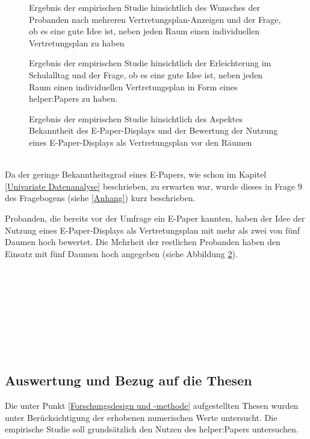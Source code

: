 \documentclass[10pt]{article}
\begin{document}
\begin{figure}[H]
  \centering
  \begin{minipage}[b]{0.49\textwidth}
    
  \caption{Ergebnis der empirischen Studie hinsichtlich des Wunsches der Probanden nach mehreren Vertretungsplan-Anzeigen und der Frage, ob es eine gute Idee ist, neben jeden Raum einen individuellen Vertretungsplan zu haben}
  \label{wunsch mehrere individuelle Anzeigen des vertretungsplans }
  \end{minipage}
  \hfill
  \begin{minipage}[b]{0.49\textwidth}
    
  \caption{Ergebnis der empirischen Studie hinsichtlich der Erleichterung im Schulalltag und der Frage, ob es eine gute Idee ist, neben jeden Raum einen individuellen Vertretungsplan in Form eines helper:Papers zu haben.}
  \label{Erleichterung durch helper:Paper}
  \end{minipage}
\end{figure}
\clearpage
\begin{figure}
  \centering 
  
  \caption{Ergebnis der empirischen Studie hinsichtlich des Aspektes Bekanntheit des E-Paper-Displays und der Bewertung der Nutzung eines E-Paper-Displays als Vertretungsplan vor den Räumen}
  \label{Sinnvoller Einsatz des helper:Papers}
\end{figure}
\mbox{}\\Da der geringe Bekanntheitsgrad eines E-Papers, wie schon im Kapitel \ref{Univariate Datenanalyse} beschrieben, zu erwarten war, wurde dieses in Frage 9 des Fragebogens (siehe \ref{Anhang}) kurz beschrieben. 

Probanden, die bereits vor der Umfrage ein E-Paper kannten, haben der Idee der Nutzung eines E-Paper-Displays als Vertretungsplan mit mehr als zwei von fünf Daumen hoch bewertet.
Die Mehrheit der restlichen Probanden haben den Einsatz mit fünf Daumen hoch angegeben (siehe Abbildung \ref{Sinnvoller Einsatz des helper:Papers}).
\\\\\\\\\\\\\\\\\\
\subsection{Auswertung und Bezug auf die Thesen} \label{Studie Auswertung}
Die unter Punkt \ref{Forschungsdesign und -methode} aufgestellten Thesen wurden unter Berücksichtigung der erhobenen numerischen Werte untersucht. Die empirische Studie soll grundsätzlich den Nutzen des helper:Papers untersuchen.
\end{document}
